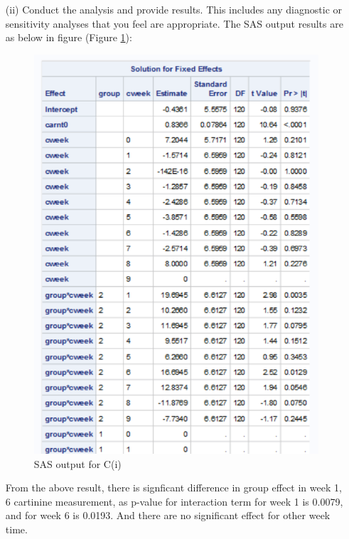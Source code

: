 \begin{itemize}
\begin{itemize}
	
													\vspace{0.2cm}
												  \item[(ii)] Conduct the analysis and provide results.	This includes any diagnostic or sensitivity analyses
																			that you feel are appropriate.
The SAS output results are as below in figure (Figure \ref{fig:c1}):
\begin{figure}[h]
    \centering
    \includegraphics[scale=1]{HW4/img/c1.png}
    \caption{SAS output for C(i)}
\label{fig:c1}
\end{figure}

From the above result, there is signficant difference in group effect in week 1, 6 cartinine measurement, as p-value for interaction term for week 1 is 0.0079, and for week 6 is 0.0193. 
And there are no significant effect for other week time. 


\end{itemize}
\end{itemize}
